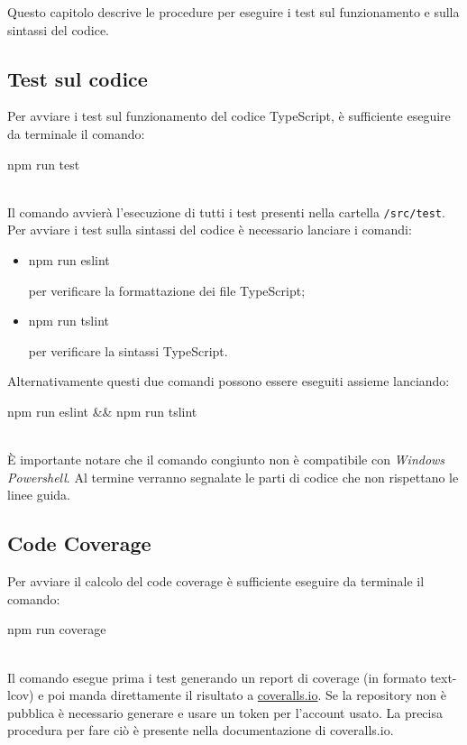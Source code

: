 Questo capitolo descrive le procedure per eseguire i test sul funzionamento e sulla sintassi del codice.
\subsection{Test sul codice}
Per avviare i test sul funzionamento del codice TypeScript, è sufficiente eseguire da terminale il comando:
\\[0.2cm]
\hspace*{10mm}
\begin{ttfamily}
	npm run test
\end{ttfamily}
\\[0.2cm]
Il comando avvierà l'esecuzione di tutti i test presenti nella cartella \texttt{/src/test}.
Per avviare i test sulla sintassi del codice è necessario lanciare i comandi:
\begin{itemize}
	\item \begin{ttfamily}npm run eslint\end{ttfamily} per verificare la formattazione dei file TypeScript;
	\item \begin{ttfamily}npm run tslint\end{ttfamily}
	per verificare la sintassi TypeScript.
\end{itemize}
Alternativamente questi due comandi possono essere eseguiti assieme lanciando:\\[0.2cm]
\hspace*{10mm}
\begin{ttfamily}
npm run eslint \&\& npm run tslint
\end{ttfamily}
\\[0.2cm]
È importante notare che il comando congiunto non è compatibile con \emph{Windows Powershell}.
Al termine verranno segnalate le parti di codice che non rispettano le linee guida.

\subsection{Code Coverage}
Per avviare il calcolo del code coverage è sufficiente eseguire da terminale il comando:
\\[0.2cm]
\hspace*{10mm}
\begin{ttfamily}
	npm run coverage
\end{ttfamily}
\\[0.2cm]
Il comando esegue prima i test generando un report di coverage (in formato text-lcov) e poi manda direttamente il risultato a \href{https://coveralls.io/}{coveralls.io}.
Se la repository non è pubblica è necessario generare e usare un token per l'account usato. La precisa procedura per fare ciò è presente nella documentazione di coveralls.io.

\pagebreak